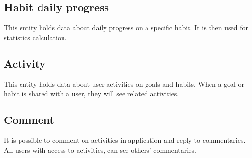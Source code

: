 \subsection{Habit daily progress}\label{subsec:habit-daily-progress}

This entity holds data about daily progress on a specific habit.
It is then used for statistics calculation.

\subsection{Activity}\label{subsec:activity}

This entity holds data about user activities on goals and habits.
When a goal or habit is shared with a user, they will see related activities.

\subsection{Comment}\label{subsec:comment}

It is possible to comment on activities in application and reply to commentaries.
All users with access to activities, can see others' commentaries.